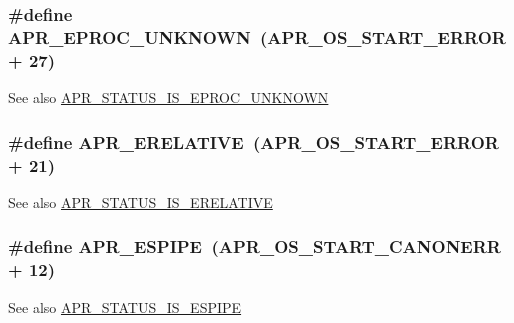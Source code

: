 \subsubsection[{\texorpdfstring{A\+P\+R\+\_\+\+E\+P\+R\+O\+C\+\_\+\+U\+N\+K\+N\+O\+WN}{APR_EPROC_UNKNOWN}}]{\setlength{\rightskip}{0pt plus 5cm}\#define A\+P\+R\+\_\+\+E\+P\+R\+O\+C\+\_\+\+U\+N\+K\+N\+O\+WN~({\bf A\+P\+R\+\_\+\+O\+S\+\_\+\+S\+T\+A\+R\+T\+\_\+\+E\+R\+R\+OR} + 27)}\hypertarget{group___a_p_r___error_ga01b21dc62b410707f44641d3cea3e6ed}{}\label{group___a_p_r___error_ga01b21dc62b410707f44641d3cea3e6ed}
\begin{DoxySeeAlso}{See also}
\hyperlink{group___a_p_r___s_t_a_t_u_s___i_s_gab1267636d1f3fe0dcb79a22b735a5010}{A\+P\+R\+\_\+\+S\+T\+A\+T\+U\+S\+\_\+\+I\+S\+\_\+\+E\+P\+R\+O\+C\+\_\+\+U\+N\+K\+N\+O\+WN} 
\end{DoxySeeAlso}
\subsubsection[{\texorpdfstring{A\+P\+R\+\_\+\+E\+R\+E\+L\+A\+T\+I\+VE}{APR_ERELATIVE}}]{\setlength{\rightskip}{0pt plus 5cm}\#define A\+P\+R\+\_\+\+E\+R\+E\+L\+A\+T\+I\+VE~({\bf A\+P\+R\+\_\+\+O\+S\+\_\+\+S\+T\+A\+R\+T\+\_\+\+E\+R\+R\+OR} + 21)}\hypertarget{group___a_p_r___error_gae4688dfa866265b9ec3623689c23923b}{}\label{group___a_p_r___error_gae4688dfa866265b9ec3623689c23923b}
\begin{DoxySeeAlso}{See also}
\hyperlink{group___a_p_r___s_t_a_t_u_s___i_s_gab94e45c2399498c31322d4b28d026ba0}{A\+P\+R\+\_\+\+S\+T\+A\+T\+U\+S\+\_\+\+I\+S\+\_\+\+E\+R\+E\+L\+A\+T\+I\+VE} 
\end{DoxySeeAlso}
\subsubsection[{\texorpdfstring{A\+P\+R\+\_\+\+E\+S\+P\+I\+PE}{APR_ESPIPE}}]{\setlength{\rightskip}{0pt plus 5cm}\#define A\+P\+R\+\_\+\+E\+S\+P\+I\+PE~({\bf A\+P\+R\+\_\+\+O\+S\+\_\+\+S\+T\+A\+R\+T\+\_\+\+C\+A\+N\+O\+N\+E\+RR} + 12)}\hypertarget{group___a_p_r___error_ga3be81035cd2da76fbc27c75496489359}{}\label{group___a_p_r___error_ga3be81035cd2da76fbc27c75496489359}
\begin{DoxySeeAlso}{See also}
\hyperlink{group___a_p_r___s_t_a_t_u_s___i_s_ga791b58edf9cd579681f03012affaf8b2}{A\+P\+R\+\_\+\+S\+T\+A\+T\+U\+S\+\_\+\+I\+S\+\_\+\+E\+S\+P\+I\+PE} 
\end{DoxySeeAlso}
